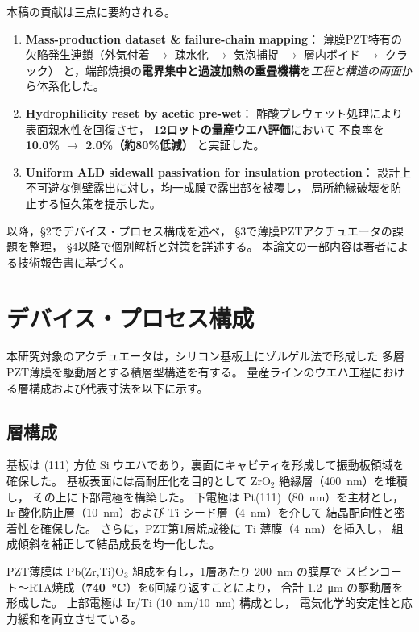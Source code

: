 \documentclass[conference]{IEEEtran}
\begin{document}
本稿の貢献は三点に要約される。
\begin{enumerate}
  \item \textbf{Mass-production dataset \& failure-chain mapping}：  
  薄膜PZT特有の欠陥発生連鎖（外気付着 $\rightarrow$ 疎水化 $\rightarrow$ 気泡捕捉 $\rightarrow$ 層内ボイド $\rightarrow$ クラック）
  と，端部焼損の\textbf{電界集中と過渡加熱の重畳機構}を\emph{工程と構造の両面}から体系化した。
  \item \textbf{Hydrophilicity reset by acetic pre-wet}：  
  酢酸プレウェット処理により表面親水性を回復させ，
  \textbf{12ロットの量産ウエハ評価}において
  不良率を \textbf{10.0\% $\rightarrow$ 2.0\%（約80\%低減）} と実証した。
  \item \textbf{Uniform ALD sidewall passivation for insulation protection}：  
  設計上不可避な側壁露出に対し，均一成膜で露出部を被覆し，
  局所絶縁破壊を防止する恒久策を提示した。
\end{enumerate}

以降，\S2でデバイス・プロセス構成を述べ，
\S3で薄膜PZTアクチュエータの課題を整理，
\S4以降で個別解析と対策を詳述する。
本論文の一部内容は著者による技術報告書\cite{Samizo2025}に基づく。

\section{デバイス・プロセス構成}
本研究対象のアクチュエータは，シリコン基板上にゾルゲル法で形成した
多層PZT薄膜を駆動層とする積層型構造を有する。
量産ラインのウエハ工程における層構成および代表寸法を以下に示す。

\subsection{層構成}
基板は (111) 方位 Si ウエハであり，裏面にキャビティを形成して振動板領域を確保した。
基板表面には高耐圧化を目的として ZrO$_2$ 絶縁層（\SI{400}{nm}）を堆積し，
その上に下部電極を構築した。
下電極は Pt(111)（\SI{80}{nm}）を主材とし，
Ir 酸化防止層（\SI{10}{nm}）および Ti シード層（\SI{4}{nm}）を介して
結晶配向性と密着性を確保した。
さらに，PZT第1層焼成後に Ti 薄膜（\SI{4}{nm}）を挿入し，
組成傾斜を補正して結晶成長を均一化した。

PZT薄膜は Pb(Zr,Ti)O$_3$ 組成を有し，1層あたり \SI{200}{nm} の膜厚で
スピンコート〜RTA焼成（\textbf{\SI{740}{\celsius}}）を6回繰り返すことにより，
合計 \SI{1.2}{\micro\metre} の駆動層を形成した。
上部電極は Ir/Ti (\SI{10}{nm}/\SI{10}{nm}) 構成とし，
電気化学的安定性と応力緩和を両立させている。
\end{document}
